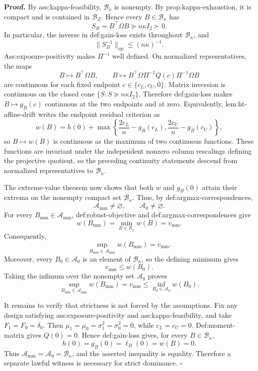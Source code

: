 \textbf{Proof.}
By ass:kappa-feasibility, \(\mathcal B_\kappa\) is nonempty.  By prop:kappa-exhaustion, it is compact and is contained in \(\mathcal B_Z\).  Hence every \(B\in\mathcal B_\kappa\) has
\[
S_B=B^{\top}\Omega B\succeq n\kappa I_2\succ0.
\]
In particular, the inverse in def:gain-loss exists throughout \(\mathcal B_\kappa\), and
\[
\lVert S_B^{-1}\rVert_{\mathrm{op}}\le (n\kappa)^{-1}.
\]
Ass:exposure-positivity makes \(\Pi^{-1}\) well defined.  On normalized representatives, the maps
\[
B\longmapsto B^{\top}\Omega B,
\qquad
B\longmapsto B^{\top}\Omega\Pi^{-1}Q(c)\Pi^{-1}\Omega B
\]
are continuous for each fixed endpoint \(c\in\{c_L,c_U,0\}\).  Matrix inversion is continuous on the closed cone \(\{S:S\succeq n\kappa I_2\}\).  Therefore def:gain-loss makes \(B\mapsto g_B(c)\) continuous at the two endpoints and at zero.  Equivalently, lem:ht-affine-drift writes the endpoint residual criterion as
\[
w(B)=h(0)+\max\left\{\frac{2c_L}{n}-g_B(c_L),
                         \frac{2c_U}{n}-g_B(c_U)\right\},
\]
so \(B\mapsto w(B)\) is continuous as the maximum of two continuous functions.  These functions are invariant under the independent nonzero column rescalings defining the projective quotient, so the preceding continuity statements descend from normalized representatives to \(\mathcal B_\kappa\).

The extreme-value theorem now shows that both \(w\) and \(g_B(0)\) attain their extrema on the nonempty compact set \(\mathcal B_\kappa\).  Thus, by def:argmax-correspondences,
\[
\mathcal A_{\mathrm{mm}}\ne\varnothing,
\qquad
\mathcal A_0\ne\varnothing.
\]
For every \(B_{\mathrm{mm}}\in\mathcal A_{\mathrm{mm}}\), def:robust-objective and def:argmax-correspondences give
\[
w(B_{\mathrm{mm}})=\min_{B\in\mathcal B_\kappa}w(B)=v_{\mathrm{mm}}.
\]
Consequently,
\[
\sup_{B_{\mathrm{mm}}\in\mathcal A_{\mathrm{mm}}}w(B_{\mathrm{mm}})
=v_{\mathrm{mm}}.
\]
Moreover, every \(B_0\in\mathcal A_0\) is an element of \(\mathcal B_\kappa\), so the defining minimum gives
\[
v_{\mathrm{mm}}\le w(B_0).
\]
Taking the infimum over the nonempty set \(\mathcal A_0\) proves
\[
\sup_{B_{\mathrm{mm}}\in\mathcal A_{\mathrm{mm}}}w(B_{\mathrm{mm}})
=v_{\mathrm{mm}}
\le \inf_{B_0\in\mathcal A_0}w(B_0).
\]

It remains to verify that strictness is not forced by the assumptions.  Fix any design satisfying ass:exposure-positivity and ass:kappa-feasibility, and take \(F_1=F_0=\delta_0\).  Then \(\mu_1=\mu_0=\sigma_1^2=\sigma_0^2=0\), while \(c_L=c_U=0\).  Def:moment-matrix gives \(Q(0)=0\).  Hence def:gain-loss gives, for every \(B\in\mathcal B_\kappa\),
\[
h(0)=g_B(0)=\ell_B(0)=w(B)=0.
\]
Thus \(\mathcal A_{\mathrm{mm}}=\mathcal A_0=\mathcal B_\kappa\), and the asserted inequality is equality.  Therefore a separate lawful witness is necessary for strict dominance. \(\square\)